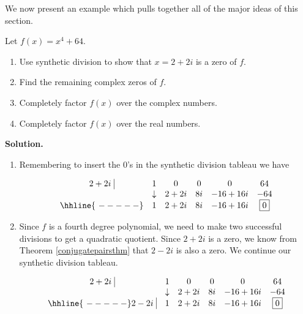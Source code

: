 We now present an example which pulls together all of the major ideas of this section.

\begin{ex}  Let $f(x) = x^4+64$.  

\begin{enumerate}

\item  Use synthetic division to show that $x=2+2i$ is a zero of $f$.

\item  Find the remaining complex zeros of $f$.

\item  Completely factor $f(x)$ over the complex numbers.

\item  Completely factor $f(x)$ over the real numbers.

\end{enumerate}

{ \bf Solution.}

\begin{enumerate}

\item  Remembering to insert the $0$'s in the synthetic division tableau we have

\[ \begin{array}{cccccc}
 2+2i \, \, \vline& 1 & 0 & 0  & 0 & 64 \\

  & \downarrow     &  2+2i  &  8i & -16+16i & -64\\ \hhline{~-----} 
  
               & 1 &  2+2i  & 8i & -16+16i &  \fbox{$0$}  \\ \end{array}\]

\item  Since $f$ is a fourth degree polynomial, we need to make two successful divisions to get a quadratic quotient.  Since $2+2i$ is a zero, we know from Theorem \ref{conjugatepairsthm} that $2-2i$ is also a zero.  We continue our synthetic division tableau.

\[ \begin{array}{cccccc}
  2+2i \, \, \vline& 1 & 0 & 0  & 0 & 64 \\

  & \downarrow     &  2+2i  &  8i & -16+16i & -64\\ \hhline{~-----} 
  
  2-2i \, \, \vline  & 1 &  2+2i  & 8i & -16+16i &  \fbox{$0$}  \\
    

\end{array}\]
\end{enumerate}
\end{ex}
